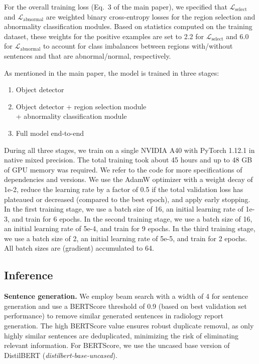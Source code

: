 \documentclass[10pt,twocolumn,letterpaper]{article}
\begin{document}
For the overall training loss (Eq.\ 3 of the main paper), we specified that $\mathcal{L}_{\text{select}}$ and $\mathcal{L}_{\text{abnormal}}$ are weighted binary cross-entropy losses for the region selection and abnormality classification modules. Based on statistics computed on the training dataset, these weights for the positive examples are set to 2.2 for $\mathcal{L}_{\text{select}}$ and 6.0 for $\mathcal{L}_{\text{abnormal}}$ to account for class imbalances between regions with/without sentences and that are abnormal/normal, respectively.

As mentioned in the main paper, the model is trained in three stages:

\begin{enumerate}
    \item Object detector
    \item Object detector + region selection module \\ + abnormality classification module
    \item Full model end-to-end
\end{enumerate}

During all three stages, we train on a single NVIDIA A40 with PyTorch 1.12.1 in native mixed precision. The total training took about 45 hours and up to 48 GB of GPU memory was required. We refer to the code for more specifications of dependencies and versions. We use the AdamW \cite{loshchilov2018decoupled} optimizer with a weight decay of 1e-2,
reduce the learning rate by a factor of 0.5 if the total validation loss has plateaued or decreased (compared to the best epoch), and apply early stopping.
In the first training stage, we use a batch size of 16, an initial learning rate of 1e-3, and train for 6 epochs.
In the second training stage, we use a batch size of 16, an initial learning rate of 5e-4, and train for 9 epochs.
In the third training stage, we use a batch size of 2, an initial learning rate of 5e-5, and train for 2 epochs.
All batch sizes are (gradient) accumulated to 64.

\subsection{Inference}

\noindent\textbf{Sentence generation.} We employ beam search with a width of 4 for sentence generation and use a BERTScore \cite{zhang2019bertscore} threshold of 0.9 (based on best validation set performance) to remove similar generated sentences in radiology report generation. The high BERTScore value ensures robust duplicate removal, as only highly similar sentences are deduplicated, minimizing the risk of eliminating relevant information. For BERTScore, we use the uncased base version of DistilBERT \cite{sanh2019distilbert} (\emph{distilbert-base-uncased}).
\end{document}
